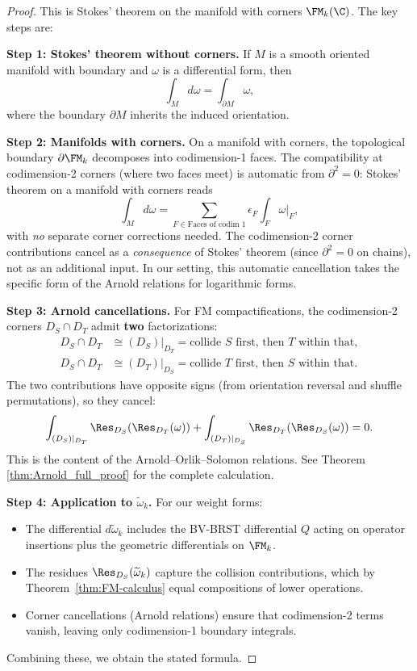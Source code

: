 \begin{proof}
This is Stokes' theorem on the manifold with corners $\FM_k(\C)$. The key steps are:

\textbf{Step 1: Stokes' theorem without corners.} If $M$ is a smooth oriented manifold with boundary and $\omega$ is a differential form, then
\[
\int_M d\omega = \int_{\partial M} \omega,
\]
where the boundary $\partial M$ inherits the induced orientation.

\textbf{Step 2: Manifolds with corners.} On a manifold with corners, the topological boundary $\partial \FM_k$ decomposes into codimension-1 faces. The compatibility at codimension-2 corners (where two faces meet) is automatic from $\partial^2 = 0$: Stokes' theorem on a manifold with corners reads
\[
\int_M d\omega = \sum_{F \in \text{Faces of codim 1}} \epsilon_F \int_F \omega|_F,
\]
with \emph{no} separate corner corrections needed. The codimension-2 corner contributions cancel as a \emph{consequence} of Stokes' theorem (since $\partial^2 = 0$ on chains), not as an additional input. In our setting, this automatic cancellation takes the specific form of the Arnold relations for logarithmic forms.

\textbf{Step 3: Arnold cancellations.} For FM compactifications, the codimension-2 corners $D_S \cap D_T$ admit \textbf{two} factorizations:
\begin{align*}
D_S \cap D_T &\cong (D_S)|_{D_T} = \text{collide $S$ first, then $T$ within that},\\
D_S \cap D_T &\cong (D_T)|_{D_S} = \text{collide $T$ first, then $S$ within that}.
\end{align*}
The two contributions have opposite signs (from orientation reversal and shuffle permutations), so they cancel:
\[
\int_{(D_S)|_{D_T}} \Res_{D_S}(\Res_{D_T}(\omega)) + \int_{(D_T)|_{D_S}} \Res_{D_T}(\Res_{D_S}(\omega)) = 0.
\]
This is the content of the Arnold--Orlik--Solomon relations. See Theorem \ref{thm:Arnold_full_proof} for the complete calculation.

\textbf{Step 4: Application to $\widetilde{\omega}_k$.} For our weight forms:
\begin{itemize}
\item The differential $d\widetilde{\omega}_k$ includes the BV-BRST differential $Q$ acting on operator insertions plus the geometric differentials on $\FM_k$.
\item The residues $\Res_{D_S}(\widetilde{\omega}_k)$ capture the collision contributions, which by Theorem~\ref{thm:FM-calculus} equal compositions of lower operations.
\item Corner cancellations (Arnold relations) ensure that codimension-2 terms vanish, leaving only codimension-1 boundary integrals.
\end{itemize}

Combining these, we obtain the stated formula.
\end{proof}

